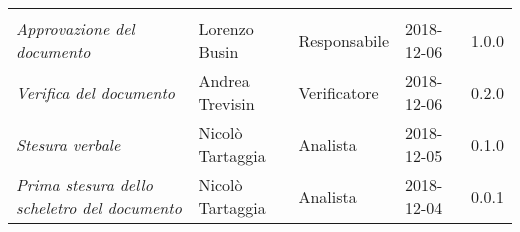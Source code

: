 \newpage 
\section*{}
\begin{table}[H]
	\centering
	\begin{tabular}{p{4cm}|C{3cm}|C{3cm}|R{2.5cm}|R{2cm}}
		
		 & & & & \\
		
		
		\emph{Approvazione del documento} &  Lorenzo Busin & Responsabile & 2018-12-06 & 1.0.0 \\
		\hline
		
		\emph{Verifica del documento} & Andrea Trevisin & Verificatore & 2018-12-06 & 0.2.0 \\
		\hline

		\emph{Stesura verbale} & Nicolò Tartaggia & Analista & 2018-12-05 & 0.1.0 \\
		\hline
		
		\emph{Prima stesura dello scheletro del documento} & Nicolò Tartaggia & Analista & 2018-12-04 & 0.0.1 \\
		
	\end{tabular}
	
\end{table}


\clearpage